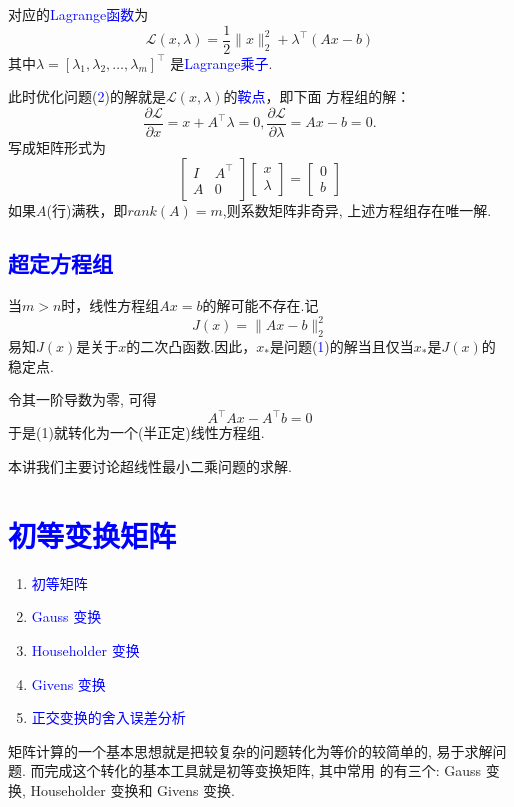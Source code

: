 \documentclass[12pt,a4paper]{article}
\begin{document}
\noindent 对应的\textcolor{blue}{Lagrange函数}为$$\mathcal{L}(x, \lambda)=\frac{1}{2}\|x\|_{2}^{2}+\lambda^{\top}(A x-b)$$
其中$\lambda=\left[\lambda_{1}, \lambda_{2}, \ldots, \lambda_{m}\right]^{\top}$
是\textcolor{blue}{Lagrange乘子}.

此时优化问题(\textcolor{blue}{2})的解就是$\mathcal{L}(x,\lambda)$的\textcolor{blue}{鞍点}，即下面
方程组的解：$$\frac{\partial \mathcal{L}}{\partial x}=x+{A}^{\top}
\lambda=0,\frac{\partial \mathcal{L}}{\partial \lambda}=Ax-b=0.$$
写成矩阵形式为$$
\left[\begin{array}{ll}{I} & {A^{\top}} \\ {A} &{0}\end{array}\right]\left[\begin{array}{l}{x} \\{\lambda}\end{array}\right]=\left[\begin{array}{l}{0} \\{b}\end{array}\right]
$$
如果$A$(行)满秩，即$rank(A)=m$,则系数矩阵非奇异, 上述方程组存在唯一解.

\subsection{\textcolor{blue}{超定方程组}}
当$m>n$时，线性方程组$Ax=b$的解可能不存在.记$$J(x)=\|A x-b\|_{2}^{2}$$
易知$J(x)$是关于$x$的二次凸函数.因此，$x_*$是问题(\textcolor{blue}{1})的解当且仅当$x_*$是$J(x)$的
稳定点.

令其一阶导数为零, 可得$$A^{\top} A x-A^{\top} b=0$$
于是(1)就转化为一个(半正定)线性方程组.

本讲我们主要讨论超线性最小二乘问题的求解.
\section{\textcolor{blue}{初等变换矩阵}}
\begin{enumerate}[2.1]
	\item \textcolor{blue}{初等矩阵}
	\item \textcolor{blue}{Gauss 变换}
	\item \textcolor{blue}{Householder 变换}
	\item \textcolor{blue}{Givens 变换}
	\item \textcolor{blue}{正交变换的舍入误差分析}
\end{enumerate}
矩阵计算的一个基本思想就是把较复杂的问题转化为等价的较简单的,
易于求解问题. 而完成这个转化的基本工具就是初等变换矩阵, 其中常用
的有三个: Gauss 变换, Householder 变换和 Givens 变换.
\end{document}
